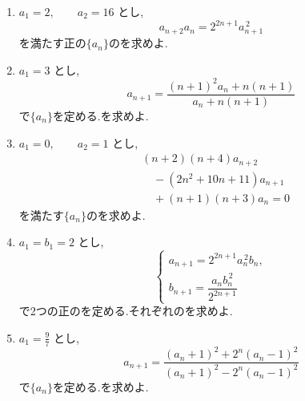 \begin{enumerate}[label=\textbf{問\arabic*.},leftmargin=3.8em,format=\bookitemlink{practice-advanced}{problem}{answer}]
\begin{align*}
                 a_{n+1}
                  &=(n+1)(a_n+b_n)\\
                  &\quad+\frac{3(a_n-b_n)}
                      {2\{3+(n+1)(a_n-b_n)\}},\\
                 b_{n+1}
                  &=(n+1)(a_n+b_n)\\
                  &\quad-\frac{3(a_n-b_n)}
                      {2\{3+(n+1)(a_n-b_n)\}}
                \end{align*}
                で2つのを定める.それぞれのを求めよ.
          \item $\displaystyle a_1=2,\qquad a_2=16$ とし,
                \[
                  a_{n+2}a_n=2^{2n+1}a_{n+1}^{\,2}
                \]
                を満たす正の$\{a_n\}$のを求めよ.
          \item $\displaystyle a_1=3$ とし,
                \[
                  a_{n+1}
                   =\frac{(n+1)^2a_n+n(n+1)}
                          {a_n+n(n+1)}
                \]
                で$\{a_n\}$を定める.を求めよ.
          \item $\displaystyle a_1=0,\qquad a_2=1$ とし,
                \begin{align*}
                 &(n+2)(n+4)a_{n+2}\\
                 &\quad-(2n^2+10n+11)a_{n+1}\\
                 &\quad+(n+1)(n+3)a_n=0
                \end{align*}
                を満たす$\{a_n\}$のを求めよ.
          \item $\displaystyle a_1=b_1=2$ とし,
                \[
                 \begin{cases}
                  a_{n+1}=2^{2n+1}a_n^{\,2}b_n,\\
                  b_{n+1}=\dfrac{a_nb_n^{\,2}}{2^{2n+1}}
                 \end{cases}
                \]
                で2つの正のを定める.それぞれのを求めよ.
          \item $\displaystyle a_1=\frac97$ とし,
                \[
                  a_{n+1}
                   =\frac{(a_n+1)^2+2^n(a_n-1)^2}
                          {(a_n+1)^2-2^n(a_n-1)^2}
                \]
                で$\{a_n\}$を定める.を求めよ.
        \end{enumerate}

